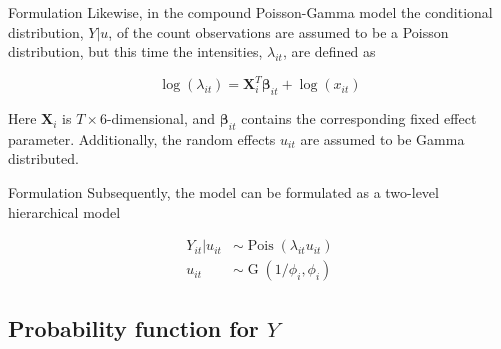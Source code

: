 \documentclass[aspectratio=169]{beamer}
\DeclareMathOperator{\G}{G}
\DeclareMathOperator{\Pois}{Pois}
\begin{document}
\begin{frame}{Formulation}
Likewise, in the compound Poisson-Gamma model the conditional
distribution, \(Y|u\), of the count observations are assumed to be a
Poisson distribution, but this time the intensities, \(\lambda_{it}\),
are defined as

\begin{equation}
  \log(\lambda_{it})=\mathbf{X}_i^T\mathbf{\beta}_{it}+\log(x_{it})
\end{equation}

Here \(\mathbf{X}_i\) is \(T\times6\)-dimensional, and
\(\mathbf{\beta}_{it}\) contains the corresponding fixed effect
parameter. Additionally, the random effects \(u_{it}\) are assumed to be
Gamma distributed.
\end{frame}

\begin{frame}{Formulation}
\protect\hypertarget{formulation-2}{}
Subsequently, the model can be formulated as a two-level hierarchical
model

\begin{subequations} \label{eq:PoisGam}
  \begin{alignat}{2}
    Y_{it}|u_{it} &\sim \Pois (\lambda_{it}u_{it}) \label{eq:pois_g0} \\ 
    u_{it} &\sim \G(1/\phi_{i},\phi_{i}) \label{eq:pois_g1}
  \end{alignat}
\end{subequations}
\end{frame}

\hypertarget{probability-function-for-y}{%
\subsection{\texorpdfstring{Probability function for
\(Y\)}{Probability function for Y}}\label{probability-function-for-y}}
\end{document}
